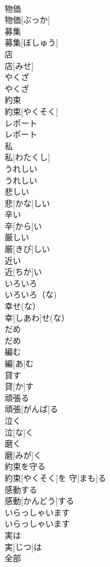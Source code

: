 \documentclass[8pt]{extreport}
\begin{document}
\begin{CJK}{UTF8}{min}
\\	物価	
\\	物価[ぶっか]
\\	募集	
\\	募集[ぼしゅう]
\\	店	
\\	店[みせ]
\\	やくざ	
\\	やくざ
\\	約束	
\\	約束[やくそく]
\\	レポート	
\\	レポート
\\	私 
\\	私[わたくし]
\\	うれしい	
\\	うれしい
\\	悲しい	
\\	悲[かな]しい
\\	辛い	
\\	辛[から]い
\\	厳しい	
\\	厳[きび]しい
\\	近い	
\\	近[ちか]い
\\	いろいろ	
\\	いろいろ（な)
\\	幸せ(な）	
\\	幸[しあわ]せ(な）
\\	だめ	
\\	だめ
\\	編む	
\\	編[あ]む
\\	貸す	
\\	貸[か]す
\\	頑張る	
\\	頑張[がんば]る
\\	泣く	
\\	泣[な]く
\\	磨く	
\\	磨[みが]く
\\	約束を守る	
\\	約束[やくそく]を 守[まも]る
\\	感動する	
\\	感動[かんどう]する
\\	いらっしゃいます	
\\	いらっしゃいます
\\	実は	
\\	実[じつ]は
\\	全部	

\end{CJK}
\end{document}
